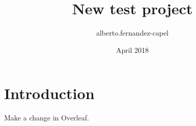 \documentclass{article}
\title{New test project}
\author{alberto.fernandez-capel }
\date{April 2018}
\begin{document}
\maketitle

\section{Introduction}

Make a change in Overleaf.
\end{document}
